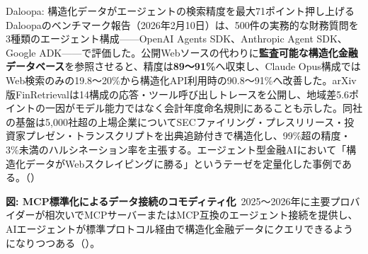 \begin{casestudy}{Daloopa: 構造化データがエージェントの検索精度を最大71ポイント押し上げる}
Daloopaのベンチマーク報告（2026年2月10日）は、500件の実務的な財務質問を3種類のエージェント構成——OpenAI Agents SDK、Anthropic Agent SDK、Google ADK——で評価した。公開Webソースの代わりに\textbf{監査可能な構造化金融データベース}を参照させると、精度は\textbf{89〜91\%}へ収束し、Claude Opus構成ではWeb検索のみの19.8〜20\%から構造化API利用時の90.8〜91\%へ改善した。arXiv版FinRetrievalは14構成の応答・ツール呼び出しトレースを公開し、地域差5.6ポイントの一因がモデル能力ではなく会計年度命名規則にあることも示した\cite{x02finretrieval2026}。同社の基盤は5,000社超の上場企業についてSECファイリング・プレスリリース・投資家プレゼン・トランスクリプトを出典追跡付きで構造化し、99\%超の精度・3\%未満のハルシネーション率を主張する。エージェント型金融AIにおいて「構造化データがWebスクレイピングに勝る」というテーゼを定量化した事例である。（\cite{x02daloopabench2026,x02finretrieval2026}）
\end{casestudy}

\begin{center}
\end{center}

{\small\color{brandgray}\textbf{図: MCP標準化によるデータ接続のコモディティ化}\ 2025〜2026年に主要プロバイダーが相次いでMCPサーバーまたはMCP互換のエージェント接続を提供し、AIエージェントが標準プロトコル経由で構造化金融データにクエリできるようになりつつある（\cite{factset_mcp_nd,x02bloombergai2026,x02lsegmicrosoft2025,x02daloopabench2026}）。}

